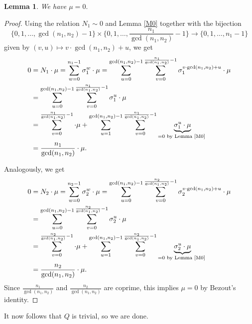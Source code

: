 \documentclass[12pt,a4paper]{article}
\newtheorem{lemma}[theorem]{Lemma}
\theoremstyle{definition}
\begin{document}
\begin{lemma}
We have $\mu=0.$
\end{lemma}
\begin{proof}
Using the relation $N_1\sim 0$ and Lemma \ref{M0} together with the bijection $$\{0,1,\dots,\gcd(n_1,n_2)-1\}\times \{0,1,\dots,\frac{n_1}{\gcd(n_1,n_2)}-1\}\to \{0,1,\dots, n_1-1\}$$
given by $(v,u)\mapsto v\cdot \gcd(n_1,n_2)+u$, we get
\begin{align*}
0&=N_1\cdot \mu=\sum_{w=0}^{n_1-1}\sigma_1^w\cdot \mu=\sum_{u=0}^{\gcd(n_1,n_2)-1}\sum_{v=0}^{\frac{n_1}{\gcd(n_1,n_2)}-1}\sigma_1^{ v\cdot \gcd(n_1,n_2)+u}\cdot \mu\\
&=\sum_{u=0}^{\gcd(n_1,n_2)-1}\sum_{v=0}^{\frac{n_1}{\gcd(n_1,n_2)}-1}\sigma_1^{u}\cdot \mu\\
&=\sum_{v=0}^{\frac{n_1}{\gcd(n_1,n_2)}-1}\cdot \mu+\sum_{u=1}^{\gcd(n_1,n_2)-1}\sum_{v=0}^{\frac{n_1}{\gcd(n_1,n_2)}-1}\underbrace{\sigma_1^{u}\cdot \mu}_{=0 \text { by Lemma \ref{M0} }}\\
&=\frac{n_1}{\gcd(n_1,n_2)}\cdot \mu.
\end{align*}

Analogously, we get 
\begin{align*}
0&=N_2\cdot \mu=\sum_{w=0}^{n_2-1}\sigma_2^w\cdot \mu=\sum_{u=0}^{\gcd(n_1,n_2)-1}\sum_{v=0}^{\frac{n_2}{\gcd(n_1,n_2)}-1}\sigma_2^{ v\cdot \gcd(n_1,n_2)+u}\cdot \mu\\
&=\sum_{u=0}^{\gcd(n_1,n_2)-1}\sum_{v=0}^{\frac{n_2}{\gcd(n_1,n_2)}-1}\sigma_2^{u}\cdot \mu\\
&=\sum_{v=0}^{\frac{n_2}{\gcd(n_1,n_2)}-1}\cdot \mu+\sum_{u=1}^{\gcd(n_1,n_2)-1}\sum_{v=0}^{\frac{n_2}{\gcd(n_1,n_2)}-1}\underbrace{\sigma_2^{u}\cdot \mu}_{=0 \text { by Lemma \ref{M0} }}\\
&=\frac{n_2}{\gcd(n_1,n_2)}\cdot \mu.
\end{align*}
Since $\frac{n_1}{\gcd(n_1,n_2)}$ and $\frac{n_2}{\gcd(n_1,n_2)}$ are coprime, this implies $\mu=0$ by Bezout's identity.
\end{proof}
It now follows that $Q$ is trivial, so we are done.
\end{document}
